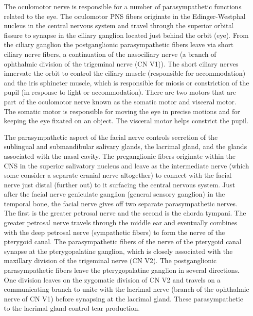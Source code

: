 The oculomotor nerve is responsible for a number of parasympathetic functions related to the eye. The oculomotor PNS fibers originate in the Edinger-Westphal nucleus in the central nervous system and travel through the superior orbital fissure to synapse in the ciliary ganglion located just behind the orbit (eye). From the ciliary ganglion the postganglionic parasympathetic fibers leave via short ciliary nerve fibers, a continuation of the nasociliary nerve (a branch of ophthalmic division of the trigeminal nerve (CN V1)). The short ciliary nerves innervate the orbit to control the ciliary muscle (responsible for accommodation) and the iris sphincter muscle, which is responsible for miosis or constriction of the pupil (in response to light or accommodation). There are two motors that are part of the oculomotor nerve known as the somatic motor and visceral motor. The somatic motor is responsible for moving the eye in precise motions and for keeping the eye fixated on an object. The visceral motor helps constrict the pupil.

The parasympathetic aspect of the facial nerve controls secretion of the sublingual and submandibular salivary glands, the lacrimal gland, and the glands associated with the nasal cavity. The preganglionic fibers originate within the CNS in the superior salivatory nucleus and leave as the intermediate nerve (which some consider a separate cranial nerve altogether) to connect with the facial nerve just distal (further out) to it surfacing the central nervous system. Just after the facial nerve geniculate ganglion (general sensory ganglion) in the temporal bone, the facial nerve gives off two separate parasympathetic nerves. The first is the greater petrosal nerve and the second is the chorda tympani. The greater petrosal nerve travels through the middle ear and eventually combines with the deep petrosal nerve (sympathetic fibers) to form the nerve of the pterygoid canal. The parasympathetic fibers of the nerve of the pterygoid canal synapse at the pterygopalatine ganglion, which is closely associated with the maxillary division of the trigeminal nerve (CN V2). The postganglionic parasympathetic fibers leave the pterygopalatine ganglion in several directions. One division leaves on the zygomatic division of CN V2 and travels on a communicating branch to unite with the lacrimal nerve (branch of the ophthalmic nerve of CN V1) before synapsing at the lacrimal gland. These parasympathetic to the lacrimal gland control tear production.

